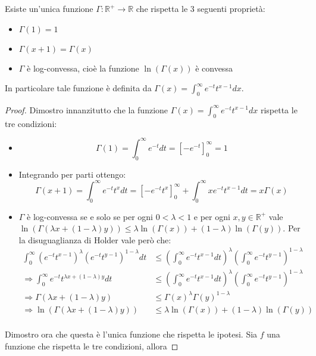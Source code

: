 \begin{theorem}
Esiste un'unica funzione $\Gamma :\mathbb{R}^{+}\rightarrow\mathbb{R} $ che rispetta le 3 seguenti proprietà:
\begin{itemize}
 \item $\Gamma(1)=1$
 \item $\Gamma(x+1)=\Gamma(x)$
 \item $\Gamma$ è log-convessa, cioè la funzione $\ln(\Gamma(x))$ è convessa
\end{itemize}
In particolare tale funzione è definita da $\Gamma(x)=\int_0^{\infty}{e^{-t}t^{x-1}dx}$.
\end{theorem}

\begin{proof}
Dimostro innanzitutto che la funzione $\Gamma(x)=\int_0^{\infty}{e^{-t}t^{x-1}dx}$ rispetta le tre condizioni:
\begin{itemize}
 \item \begin{equation}
       \Gamma(1)=\int_0^{\infty}{e^{-t}dt}=\left[-e^{-t}\right]_0^{\infty}=1
       \end{equation}
 \item Integrando per parti ottengo:
       \begin{equation} 
       \Gamma(x+1)=\int_0^{\infty}{e^{-t}t^xdt}=\left[-e^{-t}t^x\right]_0^{\infty}+\int_0^{\infty}xe^{-t}t^{x-1}dt=x\Gamma(x)
       \end{equation}
 \item $\Gamma$ è log-convessa se e solo se per ogni $0<\lambda < 1$ e per ogni $x,y \in \mathbb{R}^+$ vale 
       $\ln(\Gamma(\lambda x+(1-\lambda)y))\le \lambda \ln(\Gamma(x))+(1-\lambda)\ln(\Gamma(y))$.
       Per la disuguaglianza di Holder vale però che:
       \begin{equation}
       \begin{split}
       \int_0^{\infty}{(e^{-t}t^{x-1})^\lambda (e^{-t}t^{y-1})^{1-\lambda}dt} & \le 
       \left(\int_0^{\infty}{e^{-t}t^{x-1}dt}\right)^\lambda \left(\int_0^{\infty}{e^{-t}t^{y-1}}\right)^{1-\lambda}\\
       \Longrightarrow \int_0^{\infty}{e^{-t}t^{\lambda x +(1-\lambda)y}dt}  & \le 
       \left(\int_0^{\infty}{e^{-t}t^{x-1}dt}\right)^\lambda \left(\int_0^{\infty}{e^{-t}t^{y-1}}\right)^{1-\lambda}\\
       \Longrightarrow \Gamma(\lambda x+(1-\lambda)y) & \le \Gamma(x)^\lambda\Gamma(y)^{1-\lambda}\\
       \Longrightarrow \ln(\Gamma(\lambda x+(1-\lambda)y)) & \le \lambda\ln(\Gamma(x))+(1-\lambda)\ln(\Gamma(y))\\
       \end{split}
       \end{equation}
\end{itemize}
Dimostro ora che questa è l'unica funzione che rispetta le ipotesi. Sia $f$ una funzione che rispetta le tre condizioni, allora 


\end{proof}
